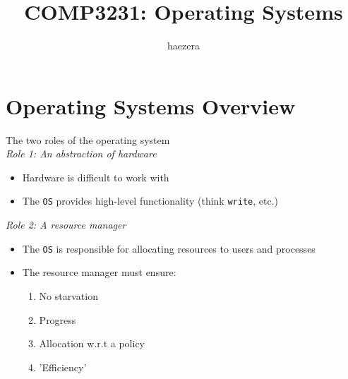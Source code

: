 \documentclass[journal, letterpaper]{IEEEtran}
\begin{document}
\title{\fontsize{15pt}{18pt}\selectfont COMP3231: Operating Systems}
\author{haezera}
\maketitle

{\small
\tableofcontents
}
\pagebreak

\section{Operating Systems Overview}
\begin{theory}{The two roles of the operating system} \\
    \textit{Role 1: An abstraction of hardware}
        \begin{itemize}
            \item Hardware is difficult to work with
            \item The \verb|OS| provides high-level functionality (think \verb|write|, etc.)
        \end{itemize}
    \textit{Role 2: A resource manager}
        \begin{itemize}
            \item The \verb|OS| is responsible for allocating resources to users and processes
            \item The resource manager must ensure:
            \begin{enumerate}
                \item No starvation
                \item Progress
                \item Allocation w.r.t a policy
                \item 'Efficiency'
            \end{enumerate}
        \end{itemize}
\end{theory}
\end{document}
